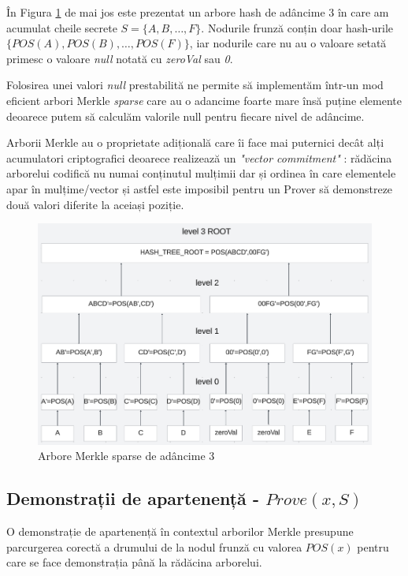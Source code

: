 \documentclass[12pt, letterpaper]{article}
\begin{document}
În Figura \ref{fig:arbore_hash1} de mai jos este prezentat un arbore hash de adâncime 3 în care am acumulat cheile secrete $S=\{A,B, \dots ,F\}$. Nodurile frunză conțin doar hash-urile $\{POS(A),POS(B), \dots ,POS(F)\}$, iar nodurile care nu au o valoare setată primesc o valoare \emph{null} notată cu \emph{zeroVal} sau \emph{0}. 

Folosirea unei valori \emph{null} prestabilită ne permite să implementăm într-un mod eficient arbori Merkle \emph{sparse} care au o adancime foarte mare însă puține elemente deoarece putem să calculăm valorile null pentru fiecare nivel de adâncime.

Arborii Merkle au o proprietate adițională care îi face mai puternici decât alți acumulatori criptografici deoarece realizează un \emph{"vector commitment"} : rădăcina arborelui codifică nu numai conținutul mulțimii dar și ordinea în care elementele apar în mulțime/vector și astfel este imposibil pentru un Prover să demonstreze două valori diferite la aceiași poziție. 

\pagebreak
\begin{figure}[h]
\centering
\includegraphics[width=1\textwidth]{hashtree.png}
\caption{Arbore Merkle sparse de adâncime 3 }
\label{fig:arbore_hash1}
\end{figure}

\subsection{Demonstrații de apartenență - $Prove(x,S)$}

O demonstrație de apartenență în contextul arborilor Merkle presupune  parcurgerea corectă a drumului de la nodul frunză cu valorea $POS(x)$ pentru care se face demonstrația până la rădăcina arborelui.
\end{document}
